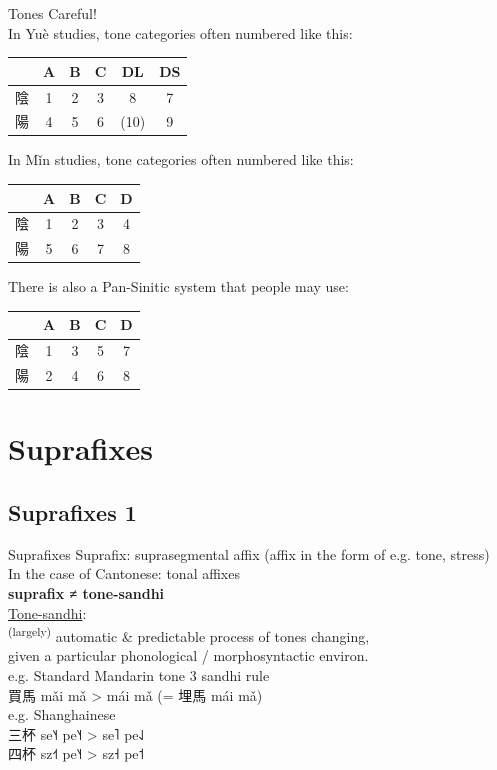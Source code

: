 \documentclass{beamer}
\begin{document}
\begin{frame}[fragile]{Tones}
Careful!\\ 
In Yuè studies, tone categories often numbered like this:\\

\begin{tabular}{c|c c c|c c}
 & A & B & C & DL & DS\\ \hline
陰 & 1 & 2 & 3 & 8 & 7\\ \hline
陽 & 4 & 5 & 6 & (10) & 9\\
\end{tabular}

\bigskip
In Mǐn studies, tone categories often numbered like this:\\
\begin{tabular}{c|c c c|c}
 & A & B & C & D\\ \hline
陰 & 1 & 2 & 3 & 4\\ \hline
陽 & 5 & 6 & 7 & 8\\
\end{tabular}

\bigskip
There is also a Pan-Sinitic system that people may use:\\
\begin{tabular}{c|c c c|c}
 & A & B & C & D\\ \hline
陰 & 1 & 3 & 5 & 7\\ \hline
陽 & 2 & 4 & 6 & 8\\
\end{tabular}


\end{frame}

\section{Suprafixes}

\subsection{Suprafixes 1}
\begin{frame}[fragile]{Suprafixes}
Suprafix: suprasegmental affix {\footnotesize (affix in the form of e.g. tone, stress)}\\
In the case of Cantonese: tonal affixes\\
\medskip
\textbf{suprafix ≠ tone-sandhi}\\
\bigskip
\underline{Tone-sandhi}:\\
\textsuperscript{(largely)} automatic \& predictable process of tones changing, \\
\quad given a particular phonological / morphosyntactic environ.\\
\medskip
e.g. Standard Mandarin tone 3 sandhi rule\\
買馬 mǎi mǎ > mái mǎ (= 埋馬 mái mǎ)\\
\smallskip
e.g. Shanghainese\\
三杯 se˥˧ pe˥˧ > se˥ pe˨˩\\
四杯 sz˧˦ pe˥˧ > sz˧ pe˦\\ 

\end{frame}
\end{document}
